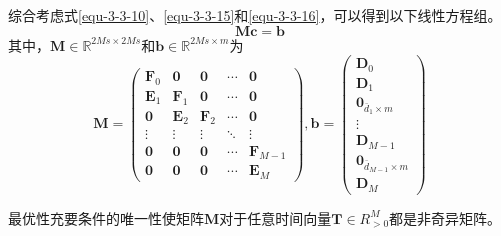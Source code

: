 \begin{tcolorbox}[red]
综合考虑式\eqref{equ-3-3-10}、\eqref{equ-3-3-15}和\eqref{equ-3-3-16}，可以得到以下线性方程组。
\begin{equation}\label{equ-3-3-17}
\mathbf{Mc=b}
\end{equation}
其中，\(\mathbf{M}\in\mathbb{R}^{2Ms\times2Ms}\)和\(\mathbf{b}\in\mathbb{R}^{2Ms\times m}\)为
\begin{equation}
\mathbf{M}=
    \begin{pmatrix}\mathbf{F}_{0}&\mathbf{0}&\mathbf{0}&\cdots&\mathbf{0}\\
    \mathbf{E}_{1}&\mathbf{F}_{1}&\mathbf{0}&\cdots&\mathbf{0}\\\mathbf{0}&\mathbf{E}_{2}&\mathbf{F}_{2}&\cdots&\mathbf{0}\\\vdots&\vdots&\vdots&\ddots&\vdots\\\mathbf{0}&\mathbf{0}&\mathbf{0}&\cdots&\mathbf{F}_{M-1}\\\mathbf{0}&\mathbf{0}&\mathbf{0}&\cdots&\mathbf{E}_{M}\end{pmatrix},
    \mathbf{b}=
    \begin{pmatrix}\mathbf{D}_{0}\\\mathbf{D}_{1}\\\mathbf{0}_{{\bar{d}_{1}\times m}}\\\vdots\\\mathbf{D}_{M-1}\\\mathbf{0}_{{\bar{d}_{M-1}\times m}}\\\mathbf{D}_{M}\end{pmatrix}
\end{equation}


最优性充要条件的唯一性使矩阵\(\mathbf{M}\)对于任意时间向量\(\mathbf{T}\in R^M_{>0}\)都是非奇异矩阵。
\end{tcolorbox}
